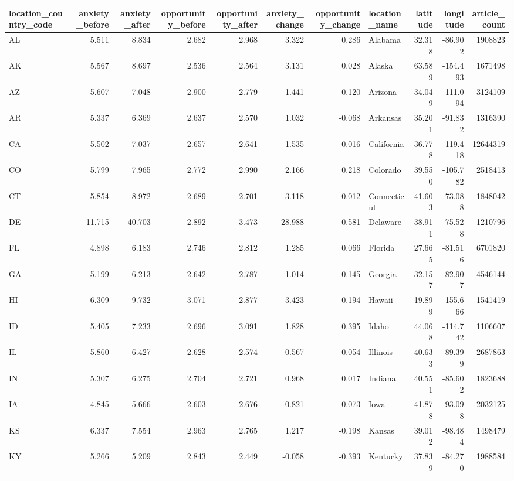 \begin{tabular}{lrrrrrrlrrr}
\toprule
location\_country\_code & anxiety\_before & anxiety\_after & opportunity\_before & opportunity\_after & anxiety\_change & opportunity\_change & location\_name & latitude & longitude & article\_count \\
\midrule
AL & 5.511 & 8.834 & 2.682 & 2.968 & 3.322 & 0.286 & Alabama & 32.318 & -86.902 & 1908823 \\
AK & 5.567 & 8.697 & 2.536 & 2.564 & 3.131 & 0.028 & Alaska & 63.589 & -154.493 & 1671498 \\
AZ & 5.607 & 7.048 & 2.900 & 2.779 & 1.441 & -0.120 & Arizona & 34.049 & -111.094 & 3124109 \\
AR & 5.337 & 6.369 & 2.637 & 2.570 & 1.032 & -0.068 & Arkansas & 35.201 & -91.832 & 1316390 \\
CA & 5.502 & 7.037 & 2.657 & 2.641 & 1.535 & -0.016 & California & 36.778 & -119.418 & 12644319 \\
CO & 5.799 & 7.965 & 2.772 & 2.990 & 2.166 & 0.218 & Colorado & 39.550 & -105.782 & 2518413 \\
CT & 5.854 & 8.972 & 2.689 & 2.701 & 3.118 & 0.012 & Connecticut & 41.603 & -73.088 & 1848042 \\
DE & 11.715 & 40.703 & 2.892 & 3.473 & 28.988 & 0.581 & Delaware & 38.911 & -75.528 & 1210796 \\
FL & 4.898 & 6.183 & 2.746 & 2.812 & 1.285 & 0.066 & Florida & 27.665 & -81.516 & 6701820 \\
GA & 5.199 & 6.213 & 2.642 & 2.787 & 1.014 & 0.145 & Georgia & 32.157 & -82.907 & 4546144 \\
HI & 6.309 & 9.732 & 3.071 & 2.877 & 3.423 & -0.194 & Hawaii & 19.899 & -155.666 & 1541419 \\
ID & 5.405 & 7.233 & 2.696 & 3.091 & 1.828 & 0.395 & Idaho & 44.068 & -114.742 & 1106607 \\
IL & 5.860 & 6.427 & 2.628 & 2.574 & 0.567 & -0.054 & Illinois & 40.633 & -89.399 & 2687863 \\
IN & 5.307 & 6.275 & 2.704 & 2.721 & 0.968 & 0.017 & Indiana & 40.551 & -85.602 & 1823688 \\
IA & 4.845 & 5.666 & 2.603 & 2.676 & 0.821 & 0.073 & Iowa & 41.878 & -93.098 & 2032125 \\
KS & 6.337 & 7.554 & 2.963 & 2.765 & 1.217 & -0.198 & Kansas & 39.012 & -98.484 & 1498479 \\
KY & 5.266 & 5.209 & 2.843 & 2.449 & -0.058 & -0.393 & Kentucky & 37.839 & -84.270 & 1988584 \\

\end{tabular}
